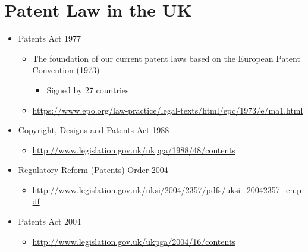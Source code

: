 \documentclass{article}
\begin{document}
\section{Patent Law in the UK}
\begin{itemize}
\item Patents Act 1977
\begin{itemize}
\item The foundation of our current patent laws based on the European Patent Convention (1973)
\begin{itemize}
\item Signed by 27 countries
\end{itemize}
\item \url{https://www.epo.org/law-practice/legal-texts/html/epc/1973/e/ma1.html}
\end{itemize}
\item Copyright, Designs and Patents Act 1988
\begin{itemize}
\item \url{http://www.legislation.gov.uk/ukpga/1988/48/contents}
\end{itemize}
\item Regulatory Reform (Patents) Order 2004
\begin{itemize}
\item \url{http://www.legislation.gov.uk/uksi/2004/2357/pdfs/uksi_20042357_en.pdf}
\end{itemize}
\item Patents Act 2004
\begin{itemize}
\item \url{http://www.legislation.gov.uk/ukpga/2004/16/contents}
\end{itemize}
\end{itemize}
\end{document}
